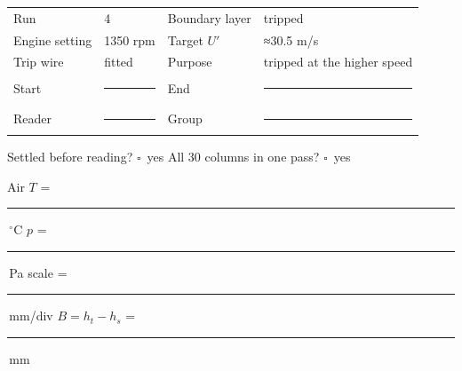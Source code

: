 \documentclass[10pt,a4paper]{article}
\newcommand{\blank}{\rule{1.55cm}{0.4pt}}
\newcommand{\checkbox}{\ensuremath{\square}}
\begin{document}
\begin{tabularx}{\textwidth}{@{}p{3.1cm}p{2.7cm}p{3.0cm}X@{}}
\toprule
Run & 4 & Boundary layer & tripped \\
Engine setting & 1350 rpm & Target $U'$ & ≈30.5 m/s \\
Trip wire & fitted & Purpose & tripped at the higher speed \\
Start & \blank & End & \blank \\
Reader & \blank & Group & \blank \\
\bottomrule
\end{tabularx}

{\small Settled before reading? \checkbox\ yes \qquad All 30 columns in one pass? \checkbox\ yes\par
Air $T$ = \blank\,$^\circ$C \qquad $p$ = \blank\,Pa \qquad
scale = \blank\,mm/div \qquad $B=h_t-h_s$ = \blank\,mm}
\end{document}

